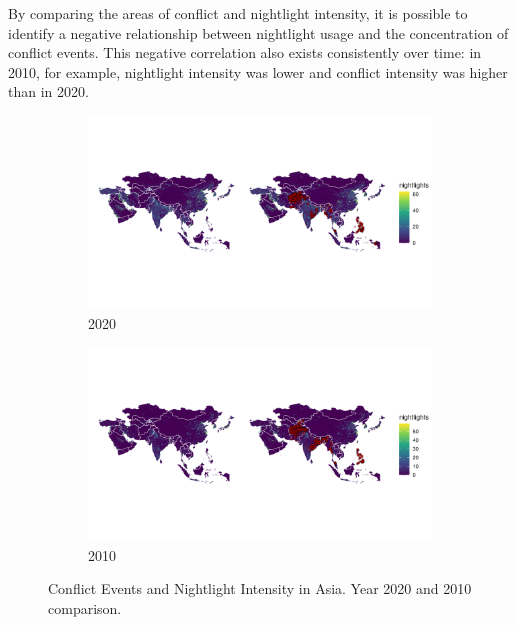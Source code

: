 \documentclass[11pt]{article}
\begin{document}
By comparing the areas of conflict and nightlight intensity, it is possible to identify a negative relationship between nightlight usage and the concentration of conflict events. This negative correlation also exists consistently over time: in 2010, for example, nightlight intensity was lower and conflict intensity was higher than in 2020.

\begin{figure}[ht]
     \centering
     \begin{subfigure}[b]{0.9\textwidth}
         \centering
         \includegraphics[width=\textwidth]{map_asian_2020.png}
         \caption{2020}
         \label{fig:asian2020}
     \end{subfigure}
    \begin{subfigure}[b]{0.9\textwidth}
         \centering
         \includegraphics[width=\textwidth]{map_asian_2010.png}
         \caption{2010}
         \label{fig:asian2010}
    \end{subfigure}
    \caption{Conflict Events and Nightlight Intensity in Asia. Year 2020 and 2010 comparison.}
    \label{fig:asianmap}
\end{figure}
\end{document}
